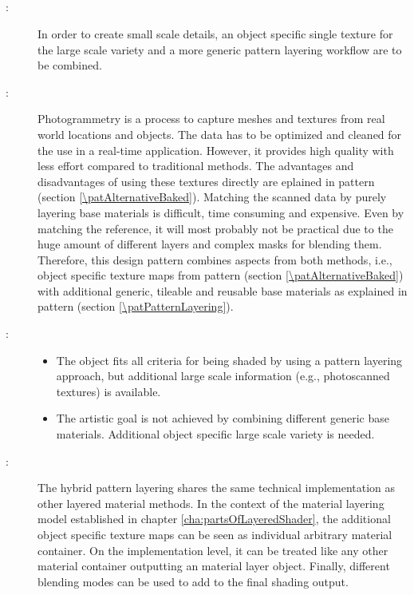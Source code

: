 \subsection{\patPatternLayeringHybrid}\label{\patPatternLayeringHybrid}
\begin{description}
	\item[\patIntent:]%
	In order to create small scale details, an object specific single texture for the large scale variety and a more generic pattern layering workflow are to be combined.
	\item[\patMotivation:]%
	Photogrammetry is a process to capture meshes and textures from real world locations and objects. The data has to be optimized and cleaned for the use in a real-time application. However, it provides high quality with less effort compared to traditional methods. The advantages and disadvantages of using these textures directly are eplained in pattern \emph{\patAlternativeBaked} (section \ref{\patAlternativeBaked}). Matching the scanned data by purely layering base materials is difficult, time consuming and expensive. Even by matching the reference, it will most probably not be practical due to the huge amount of different layers and complex masks for blending them. Therefore, this design pattern combines aspects from both methods, i.e., object specific texture maps from pattern \emph{\patAlternativeBaked} (section \ref{\patAlternativeBaked}) with additional generic, tileable and reusable base materials as explained in pattern \emph{\patPatternLayering} (section \ref{\patPatternLayering}).
	\item[\patApplicability:]\hfill
	\begin{itemize}\mynobreakpar
		\item The object fits all criteria for being shaded by using a pattern layering approach, but additional large scale information (e.g., photoscanned textures) is available. 
		\item The artistic goal is not achieved by combining different generic base materials. Additional object specific large scale variety is needed. 
	\end{itemize}
	\item[\patImplementation:]%
	The hybrid pattern layering shares the same technical implementation as other layered material methods. In the context of the material layering model established in chapter \ref{cha:partsOfLayeredShader}, the additional object specific texture maps can be seen as individual arbitrary material container. On the implementation level, it can be treated like any other material container outputting an material layer object. Finally, different blending modes can be used to add to the final shading output. %

\end{description}
